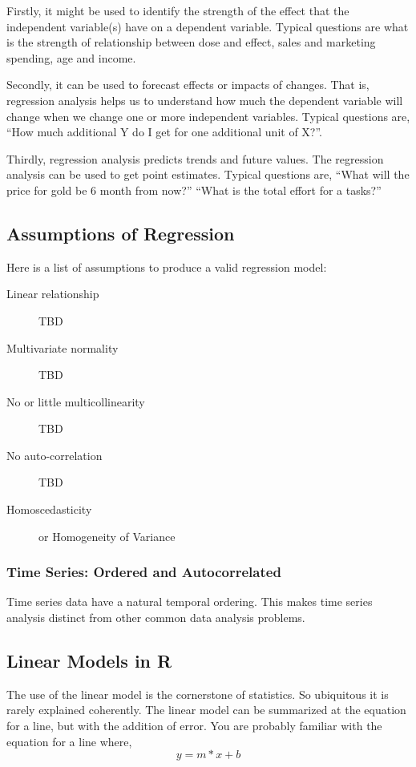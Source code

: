 \documentclass{article}\usepackage[]{graphicx}\usepackage[]{color}
\begin{document}
Firstly, it might be used to identify the strength of the effect that the independent variable(s) have on a dependent variable.  Typical questions are what is the strength of relationship between dose and effect, sales and marketing spending, age and income.

Secondly, it can be used to forecast effects or impacts of changes.  That is, regression analysis helps us to understand how much the dependent variable will change when we change one or more independent variables.  Typical questions are, “How much additional Y do I get for one additional unit of X?”.

Thirdly, regression analysis predicts trends and future values.  The regression analysis can be used to get point estimates.  Typical questions are, ``What will the price for gold be 6 month from now?'' ``What is the total effort for a tasks?''

\subsection{Assumptions of Regression}

Here is a list of assumptions to produce a valid regression model:

\begin{description}
  \item[Linear relationship] TBD
  \item[Multivariate normality] TBD
  \item[No or little multicollinearity] TBD
  \item[No auto-correlation] TBD
  \item[Homoscedasticity] or Homogeneity of Variance
\end{description}

\subsubsection{Time Series: Ordered and Autocorrelated}

Time series data have a natural temporal ordering. This makes time series analysis distinct from other common data analysis problems.

\subsection{Linear Models in R}

The use of the linear model is the cornerstone of statistics. So ubiquitous it is rarely explained coherently. The linear model can be summarized at the equation for a line, but with the addition of error. You are probably familiar with the equation for a line where, 
\begin{equation}
y = m * x + b
\end{equation}
\end{document}
